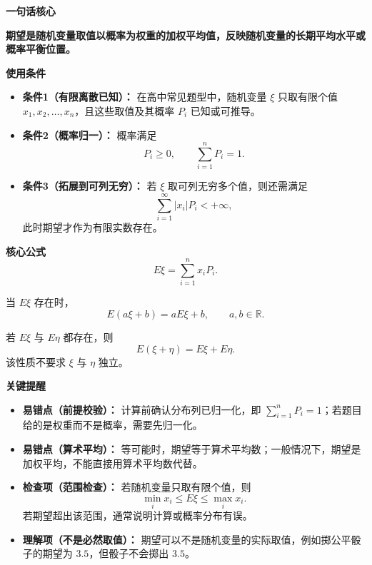 \begin{summarybox}
	\textbf{\textcolor{CSummary}{一句话核心}}

	\textbf{期望是随机变量取值以概率为权重的加权平均值，反映随机变量的长期平均水平或概率平衡位置。}

	\medskip
	\textbf{\textcolor{CSummary}{使用条件}}
	\begin{itemize}[leftmargin=*, itemsep=0.5em, topsep=0.4em]
		\item \textbf{条件1（有限离散已知）：} 在高中常见题型中，随机变量 $\xi$ 只取有限个值 $x_1,x_2,\dots,x_n$，且这些取值及其概率 $P_i$ 已知或可推导。
		\item \textbf{条件2（概率归一）：} 概率满足
		      \[
			      P_i\ge0,\qquad \sum_{i=1}^{n}P_i=1.
		      \]
		\item \textbf{条件3（拓展到可列无穷）：} 若 $\xi$ 取可列无穷多个值，则还需满足
		      \[
			      \sum_{i=1}^{\infty}|x_i|P_i<+\infty,
		      \]
		      此时期望才作为有限实数存在。
	\end{itemize}

	\medskip
	\textbf{\textcolor{CSummary}{核心公式}}
	\[
		E\xi=\sum_{i=1}^{n}x_iP_i.
	\]

	当 $E\xi$ 存在时，
	\[
		E(a\xi+b)=aE\xi+b,\qquad a,b\in\mathbb{R}.
	\]

	若 $E\xi$ 与 $E\eta$ 都存在，则
	\[
		E(\xi+\eta)=E\xi+E\eta.
	\]
	该性质不要求 $\xi$ 与 $\eta$ 独立。

	\medskip
	\textbf{\textcolor{CSummary}{关键提醒}}
	\begin{itemize}[leftmargin=*, itemsep=0.5em, topsep=0.4em]
		\item \textbf{易错点（前提校验）：} 计算前确认分布列已归一化，即 $\sum_{i=1}^{n}P_i=1$；若题目给的是权重而不是概率，需要先归一化。
		\item \textbf{易错点（算术平均）：} 等可能时，期望等于算术平均数；一般情况下，期望是加权平均，不能直接用算术平均数代替。
		\item \textbf{检查项（范围检查）：} 若随机变量只取有限个值，则
		      \[
			      \min_i x_i\le E\xi\le \max_i x_i.
		      \]
		      若期望超出该范围，通常说明计算或概率分布有误。
		\item \textbf{理解项（不是必然取值）：} 期望可以不是随机变量的实际取值，例如掷公平骰子的期望为 $3.5$，但骰子不会掷出 $3.5$。
	\end{itemize}
\end{summarybox}